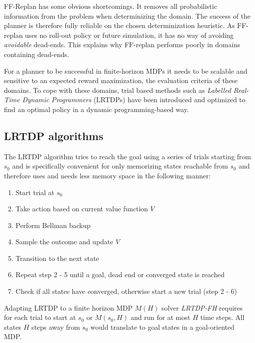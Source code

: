 \documentclass[runningheads,a4paper]{llncs}
\begin{document}
FF-Replan has some obvious shortcomings. It removes all probabilistic information from the problem when determinizing the domain. The success of the planner is therefore fully reliable on the chosen determinization heuristic. As FF-replan uses no roll-out policy or future simulation, it has no way of avoiding \emph{avoidable} dead-ends. This explains why FF-replan performs poorly in domains containing dead-ends.

For a planner to be successful in finite-horizon MDPs it needs to be scalable and sensitive to an expected reward maximization, the evaluation criteria of these domains. To cope with these domains, trial based methods such as \emph{Labelled Real-Time Dynamic Programmers} (LRTDPs) have been introduced and optimized to find an optimal policy in a dynamic programming-based way.


\subsection{LRTDP algorithms}

The LRTDP algorithm tries to reach the goal using a series of trials starting from $s_0$ and is specifically convenient for only memorizing states reachable from $s_0$ and therefore uses and needs less memory space in the following manner:

\begin{enumerate}
	\item Start trial at $s_0$
	\item Take action based on current value function $V$
	\item Perform Bellman backup
	\item Sample the outcome and update $V$
	\item Transition to the next state
	\item Repeat step 2 - 5 until a goal, dead end or converged state is reached
	\item Check if all states have converged, otherwise start a new trial (step 2 - 6)
\end{enumerate}

Adapting LRTDP to a finite horizon MDP $M(H)$ solver \emph{LRTDP-FH} requires for each trial to start at $s_0$ or $M(s_0, H)$ and run for at most $H$ time steps. All states $H$ steps away from $s_0$ would translate to goal states in a goal-oriented MDP. \\
\end{document}
